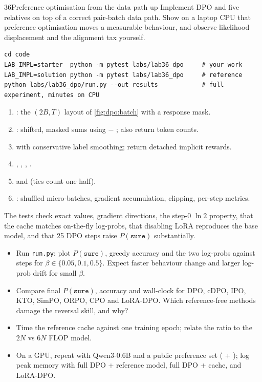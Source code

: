 \begin{labbox}{36}{Preference optimisation from the data path up}
Implement DPO and five relatives on top of a correct pair-batch data path. Show on a laptop CPU
that preference optimisation moves a measurable behaviour, and observe likelihood displacement and
the alignment tax yourself.

\begin{lstlisting}[style=shell]
cd code
LAB_IMPL=starter  python -m pytest labs/lab36_dpo     # your work
LAB_IMPL=solution python -m pytest labs/lab36_dpo     # reference
python labs/lab36_dpo/run.py --out results            # full experiment, minutes on CPU
\end{lstlisting}

\begin{enumerate}
\item {}: the $(2B,T)$ layout of \cref{fig:dpo:batch} with a response mask.
\item {}: shifted, masked sums using  $-$ ; also return
  token counts.
\item {} with conservative label smoothing; return detached implicit rewards.
\item {}, , , .
\item {} and  (ties count one half).
\item {}: shuffled micro-batches, gradient accumulation, clipping, per-step metrics.
\end{enumerate}
The tests check exact values, gradient directions, the step-0 $\ln 2$ property, that the cache
matches on-the-fly log-probs, that disabling LoRA reproduces the base model, and that 25 DPO
steps raise $P(\texttt{sure})$ substantially.

\begin{itemize}
\item Run \texttt{run.py}: plot $P(\texttt{sure})$, greedy accuracy and the two log-probs against steps
  for $\beta\in\{0.05,0.1,0.5\}$. Expect faster behaviour change and larger log-prob drift for
  small $\beta$.
\item Compare final $P(\texttt{sure})$, accuracy and wall-clock for DPO, cDPO, IPO, KTO, SimPO, ORPO,
  CPO and LoRA-DPO. Which reference-free methods damage the reversal skill, and why?
\item Time the reference cache against one training epoch; relate the ratio to the $2N$ vs $6N$
  FLOP model.
\item On a GPU, repeat with Qwen3-0.6B and a public preference set (
  + ); log peak memory with full DPO + reference model, full DPO + cache, and
  LoRA-DPO.
\end{itemize}


\end{labbox}
